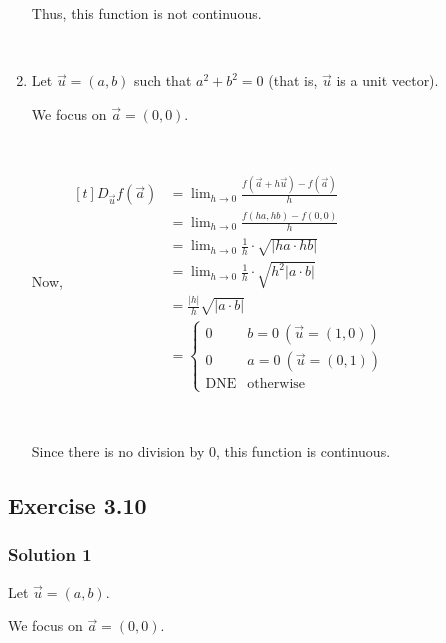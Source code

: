 \documentclass[11pt,fleqn]{book} %
\begin{document}
\begin{enumerate}[label=\alph*)]
    Thus, this function is not continuous. 

    {~~~}

    \item Let $\vec{u} = (a,b)$ such that $a^2 + b^2 = 0$ (that is, $\vec{u}$ is a unit vector). 
    
    We focus on $\vec{a} = (0,0)$. 

    {~~~}

    Now, $\begin{aligned}[t]
        D_{\vec{u}} f(\vec{a}) & = \lim_{h\to0} \frac{f(\vec{a} + h\vec{u}) - f(\vec{a})}{h} \\
                               & = \lim_{h\to0} \frac{f(ha,hb) - f(0,0)}{h}                  \\
                               & = \lim_{h\to0} \frac{1}{h} \cdot \sqrt{| ha \cdot hb |}     \\
                               & = \lim_{h\to0} \frac{1}{h} \cdot \sqrt{h^2 | a \cdot b |}   \\
                               & = \frac{|h|}{h} \sqrt{| a \cdot b |}                        \\
                               & = \begin{cases}
                                       0          & b = 0 ~ (\vec{u} = (1,0)) \\
                                       0          & a = 0 ~ (\vec{u} = (0,1)) \\
                                       \text{DNE} & \text{otherwise}
                                   \end{cases}
        \end{aligned}$

        {~~~}

        Since there is no division by $0$, this function is continuous. 
\end{enumerate}

\subsection*{Exercise 3.10}

\subsubsection*{Solution 1}

Let $\vec{u} = (a,b)$. 

We focus on $\vec{a} = (0,0)$. 
\end{document}

